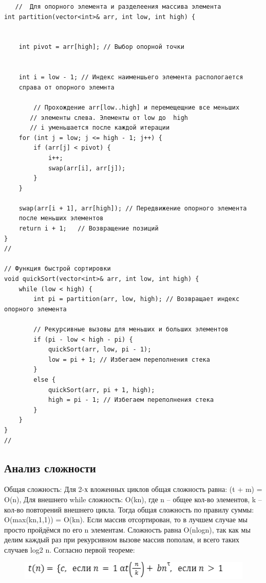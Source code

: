 \documentclass[bachelor, och, referat, times]{SCWorks}
\begin{document}
    \begin{verbatim}
   //  Для опорного элемента и разделеения массива элемента
int partition(vector<int>& arr, int low, int high) {

    
    int pivot = arr[high]; // Выбор опорной точки

   
    int i = low - 1; // Индекс наименшьего элемента распологается 
    справа от опорного элемнта

        // Прохождение arr[low..high] и перемещещние все меньших
       // элементы слева. Элементы от low до  high
       // i уменьшается после каждой итерации
    for (int j = low; j <= high - 1; j++) {
        if (arr[j] < pivot) {
            i++;
            swap(arr[i], arr[j]);
        }
    }

    swap(arr[i + 1], arr[high]); // Передвижение опорного элемента 
    после меньших элементов
    return i + 1;   // Возвращение позиций 
}
//

// Функция быстрой сортировки
void quickSort(vector<int>& arr, int low, int high) {
    while (low < high) {
        int pi = partition(arr, low, high); // Возвращает индекс опорного элемента

        // Рекурсивные вызовы для меньших и больших элементов
        if (pi - low < high - pi) {
            quickSort(arr, low, pi - 1);
            low = pi + 1; // Избегаем переполнения стека
        }
        else {
            quickSort(arr, pi + 1, high);
            high = pi - 1; // Избегаем переполнения стека
        }
    }
}
//
 \end{verbatim}


 \subsection{Анализ сложности}
 Общая сложность:
Для 2-х вложенных циклов общая сложность равна: (t + m) = O(n), 
Для внешнего while сложность: O(kn), где n – общее кол-во элементов, k – кол-во повторений внешнего цикла.
Тогда общая сложность по правилу суммы: O(max(kn,1,1)) = O(kn).
Если массив отсортирован, то в лучшем случае мы просто пройдёмся по его n элементам. Сложность равна O(nlogn), так как мы делим каждый раз при рекурсивном вызове массив пополам, и всего таких случаев log2 n.
Согласно первой теореме:
\begin{figure} [H]
        \centering
    \includegraphics[width=0.50\linewidth]{Снимок экрана 2025-08-10 214444.png}
    \label{fig:first}
    \end{figure}
\end{document}
